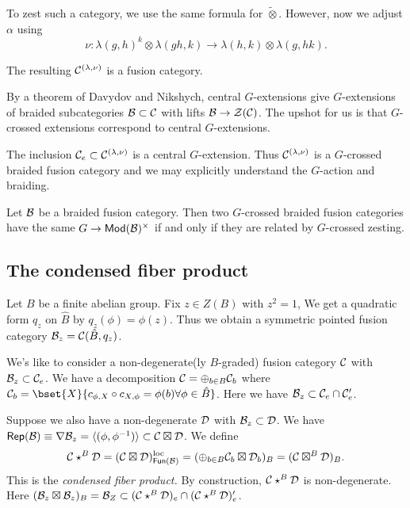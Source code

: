 \documentclass{amsart}
\begin{document}
To zest such a category, we use the same formula for $\tilde{\otimes}$.
However, now we adjust $\alpha$ using 
\[
  \nu: \lambda(g, h)^k \otimes \lambda(gh, k) \to \lambda(h, k) \otimes \lambda(g, hk).
\]

\begin{thm}
  The resulting $\mathcal{C}^{(\lambda,\nu)}$ is a fusion category.
\end{thm}

By a theorem of Davydov and Nikshych, central $G$-extensions give $G$-extensions of braided subcategories $\mathcal{B} \subset \mathcal{C}$ with lifts $\mathcal{B} \to \mathcal{Z}(\mathcal{C})$.
The upshot for us is that $G$-crossed extensions correspond to central $G$-extensions.

\begin{thm}
  The inclusion $\mathcal{C}_e \subset \mathcal{C}^{(\lambda,\nu)}$ is a central $G$-extension.
  Thus $\mathcal{C}^{(\lambda,\nu)}$ is a $G$-crossed braided fusion category and we may explicitly understand the $G$-action and braiding.
\end{thm}

\begin{thm}
  Let $\mathcal{B}$ be a braided fusion category.
  Then two $G$-crossed braided fusion categories have the same $G \to \mathsf{Mod}(\mathcal{B})^\times$ if and only if they are related by $G$-crossed zesting.
\end{thm}

\subsection{The condensed fiber product}

Let $B$ be a finite abelian group.
Fix $z \in Z(B)$ with $z^2 = 1$,
We get a quadratic form $q_z$ on $\hat{B}$ by $q_z(\phi) = \phi(z)$.
Thus we obtain a symmetric pointed fusion category $\mathcal{B}_z = \mathcal{C}(\hat{B}, q_z)$.

We's like to consider a non-degenerate(ly $B$-graded) fusion category $\mathcal{C}$ with $\mathcal{B}_z \subset \mathcal{C}_e$.
We have a decomposition $\mathcal{C} = \oplus_{b \in B} \mathcal{C}_b$ where $\Cc_b = \bset{X}{c_{\phi,X} \circ c_{X,\phi} = \phi(b) \forall \phi \in \hat{B}}$.
Here we have $\mathcal{B}_z \subset \mathcal{C}_e \cap \mathcal{C}_e'$.

Suppose we also have a non-degenerate $\mathcal{D}$ with $\mathcal{B}_z \subset \mathcal{D}$.
We have $\operatorname{\mathsf{Rep}}(\mathcal{B}) \equiv \nabla \mathcal{B}_z= \langle(\phi, \phi^{-1})\rangle \subset \mathcal{C} \boxtimes \mathcal{D}$.
We define 
\[
  \mathcal{C} \star^B \mathcal{D} = (\mathcal{C} \boxtimes \mathcal{D})^{\mathrm{loc}}_{\mathsf{Fun}(\mathcal{B})} = (\oplus_{b \in B} \mathcal{C}_b \boxtimes \mathcal{D}_b)_B = (\mathcal{C} \boxtimes^B \mathcal{D})_B.
\]
This is the \emph{condensed fiber product.}
By construction, $\mathcal{C} \star^B \mathcal{D}$ is non-degenerate.
Here $(\mathcal{B}_z \boxtimes \mathcal{B}_z)_B = \mathcal{B}_Z \subset (\mathcal{C} \star^B \mathcal{D})_e \cap (\mathcal{C} \star^B \mathcal{D})_e'$.
\end{document}
